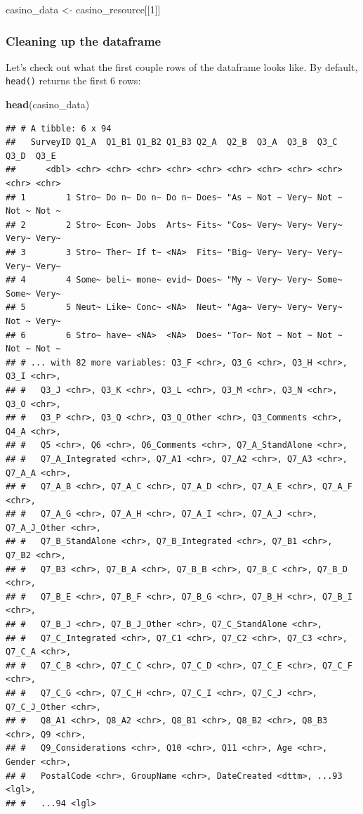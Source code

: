 \documentclass[
]{book}
\newenvironment{Shaded}{\begin{snugshade}}{\end{snugshade}}
\newcommand{\DecValTok}[1]{\textcolor[rgb]{0.00,0.00,0.81}{#1}}
\newcommand{\KeywordTok}[1]{\textcolor[rgb]{0.13,0.29,0.53}{\textbf{#1}}}
\newcommand{\NormalTok}[1]{#1}
\newcommand{\StringTok}[1]{\textcolor[rgb]{0.31,0.60,0.02}{#1}}
\begin{document}
\begin{Shaded}
\begin{Highlighting}[]
\NormalTok{casino_data <-}\StringTok{ }\NormalTok{casino_resource[[}\DecValTok{1}\NormalTok{]]}
\end{Highlighting}
\end{Shaded}

\hypertarget{cleaning-up-the-dataframe}{%
\subsubsection{Cleaning up the dataframe}\label{cleaning-up-the-dataframe}}

Let's check out what the first couple rows of the dataframe looks like. By default, \texttt{head()} returns the first 6 rows:

\begin{Shaded}
\begin{Highlighting}[]
\KeywordTok{head}\NormalTok{(casino_data) }
\end{Highlighting}
\end{Shaded}

\begin{verbatim}
## # A tibble: 6 x 94
##   SurveyID Q1_A  Q1_B1 Q1_B2 Q1_B3 Q2_A  Q2_B  Q3_A  Q3_B  Q3_C  Q3_D  Q3_E 
##      <dbl> <chr> <chr> <chr> <chr> <chr> <chr> <chr> <chr> <chr> <chr> <chr>
## 1        1 Stro~ Do n~ Do n~ Do n~ Does~ "As ~ Not ~ Very~ Not ~ Not ~ Not ~
## 2        2 Stro~ Econ~ Jobs  Arts~ Fits~ "Cos~ Very~ Very~ Very~ Very~ Very~
## 3        3 Stro~ Ther~ If t~ <NA>  Fits~ "Big~ Very~ Very~ Very~ Very~ Very~
## 4        4 Some~ beli~ mone~ evid~ Does~ "My ~ Very~ Very~ Some~ Some~ Very~
## 5        5 Neut~ Like~ Conc~ <NA>  Neut~ "Aga~ Very~ Very~ Very~ Not ~ Very~
## 6        6 Stro~ have~ <NA>  <NA>  Does~ "Tor~ Not ~ Not ~ Not ~ Not ~ Not ~
## # ... with 82 more variables: Q3_F <chr>, Q3_G <chr>, Q3_H <chr>, Q3_I <chr>,
## #   Q3_J <chr>, Q3_K <chr>, Q3_L <chr>, Q3_M <chr>, Q3_N <chr>, Q3_O <chr>,
## #   Q3_P <chr>, Q3_Q <chr>, Q3_Q_Other <chr>, Q3_Comments <chr>, Q4_A <chr>,
## #   Q5 <chr>, Q6 <chr>, Q6_Comments <chr>, Q7_A_StandAlone <chr>,
## #   Q7_A_Integrated <chr>, Q7_A1 <chr>, Q7_A2 <chr>, Q7_A3 <chr>, Q7_A_A <chr>,
## #   Q7_A_B <chr>, Q7_A_C <chr>, Q7_A_D <chr>, Q7_A_E <chr>, Q7_A_F <chr>,
## #   Q7_A_G <chr>, Q7_A_H <chr>, Q7_A_I <chr>, Q7_A_J <chr>, Q7_A_J_Other <chr>,
## #   Q7_B_StandAlone <chr>, Q7_B_Integrated <chr>, Q7_B1 <chr>, Q7_B2 <chr>,
## #   Q7_B3 <chr>, Q7_B_A <chr>, Q7_B_B <chr>, Q7_B_C <chr>, Q7_B_D <chr>,
## #   Q7_B_E <chr>, Q7_B_F <chr>, Q7_B_G <chr>, Q7_B_H <chr>, Q7_B_I <chr>,
## #   Q7_B_J <chr>, Q7_B_J_Other <chr>, Q7_C_StandAlone <chr>,
## #   Q7_C_Integrated <chr>, Q7_C1 <chr>, Q7_C2 <chr>, Q7_C3 <chr>, Q7_C_A <chr>,
## #   Q7_C_B <chr>, Q7_C_C <chr>, Q7_C_D <chr>, Q7_C_E <chr>, Q7_C_F <chr>,
## #   Q7_C_G <chr>, Q7_C_H <chr>, Q7_C_I <chr>, Q7_C_J <chr>, Q7_C_J_Other <chr>,
## #   Q8_A1 <chr>, Q8_A2 <chr>, Q8_B1 <chr>, Q8_B2 <chr>, Q8_B3 <chr>, Q9 <chr>,
## #   Q9_Considerations <chr>, Q10 <chr>, Q11 <chr>, Age <chr>, Gender <chr>,
## #   PostalCode <chr>, GroupName <chr>, DateCreated <dttm>, ...93 <lgl>,
## #   ...94 <lgl>
\end{verbatim}
\end{document}
